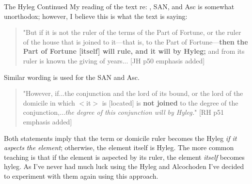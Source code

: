 \begin{frame}[t]{The Hyleg Continued}
My reading of the text re: \Fortune, SAN, and Asc is somewhat unorthodox; however, I believe this is what the text is saying:\\

\vspace{0.5cm}
\begin{quote}
"But if it is not the ruler of the terms of the Part of Fortune, or the ruler of the house that is joined to it---that is, to the Part of Fortune---\textbf{then the Part of Fortune [itself] will rule, and it will by Hyleg;} and from its ruler is known the giving of years... [JH p50 emphasis added]
\end{quote}
Similar wording is used for the SAN and Asc.  \\

\vspace{0.5cm}
\begin{quote}
"However, if...the conjunction and the lord of its bound, or the lord of the domicile in which $<$it$>$ is [located] is \textbf{not joined} to the degree of the conjunction,...\textsl{the degree of this conjunction will by Hyleg.}" [RH p51 emphasis added]
\end{quote}


Both statements imply that the term or domicile ruler becomes the Hyleg \textsl{if it aspects the element}; otherwise, the element itself is Hyleg. The more common teaching is that if the element is aspected by its ruler, the element \textsl{itself} becomes hyleg. As I've never had much luck using the Hyleg and Alcochoden I've decided to experiment with them again using this approach.
\end{frame}
